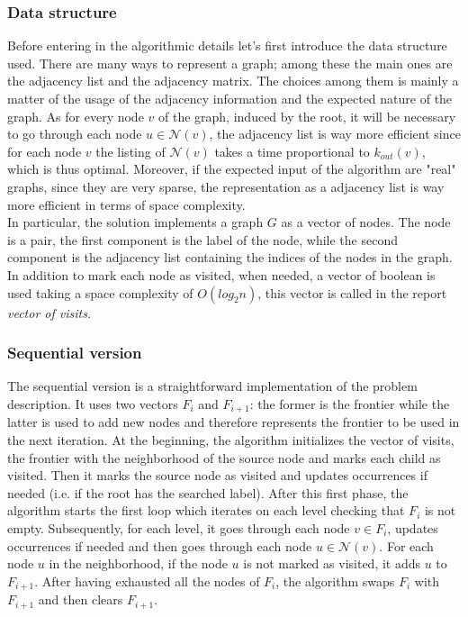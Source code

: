 \subsubsection{Data structure}
Before entering in the algorithmic details let's first introduce the data structure used.
There are many ways to represent a graph; among these the main ones are the adjacency list and the adjacency
matrix. The choices among them is mainly a matter of the usage of the adjacency information and the 
expected nature of the graph. As for every node $v$ of the graph, induced by the root, it will be necessary
to go through each node $u \in \mathcal{N}(v)$, the adjacency list is way more efficient since for each
node $v$ the listing of $\mathcal{N}(v)$ takes a time proportional to $k_{out}(v)$, which is thus optimal.
Moreover, if the expected input of the algorithm are "real" graphs, since they are very sparse, the representation as a adjacency list is way 
more efficient in terms of space complexity.
\\
In particular, the solution implements a graph $G$ as a vector of nodes.
 The node is a pair, the first component is the label of the node, while the second
 component is the adjacency list containing the indices of the nodes in the graph.
In addition to mark each node as visited, when needed, a vector of boolean is used
taking a space complexity of $O(log_2n)$, this vector is called in the report 
\textit{vector of visits}.

 \subsubsection{Sequential version}
\label{sub:seq-version}
The sequential version is a straightforward implementation of the problem
description. It uses two vectors $F_i$ and $F_{i+1}$: the former is the frontier 
while the latter is used to add new nodes and therefore represents the frontier 
to be used in the next iteration. At the beginning, the algorithm initializes the vector of visits,
 the frontier with the neighborhood of the source node and marks each child as visited. Then it marks the source node 
as visited and updates occurrences if needed (i.e. if the root has the searched label). After this first phase,
 the algorithm starts the first loop which iterates on each level checking that $F_i$ is not empty.
 Subsequently, for each level, it goes through each node $v \in F_i$, updates occurrences if needed and
 then goes through each node $u \in \mathcal{N}(v)$.
 For each node $u$ in the neighborhood, if the node $u$ is not marked as visited, 
 it adds $u$ to $F_{i+1}$. After having exhausted all the nodes of $F_i$, the algorithm
 swaps $F_i$ with $F_{i+1}$ and then clears $F_{i+1}$.

